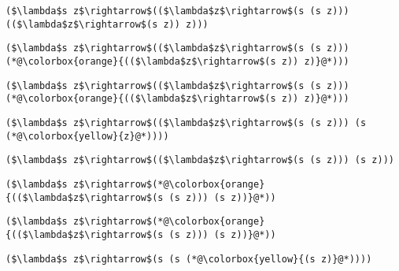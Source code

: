 \documentclass{beamer}
\begin{document}
\begin{frame}[fragile]{\CurrentSection}
\lstset{basicstyle=\ttfamily\small}\lstset{numbers=none}\lstset{language=ML}\begin{lstlisting}
($\lambda$s z$\rightarrow$(($\lambda$z$\rightarrow$(s (s z))) (($\lambda$z$\rightarrow$(s z)) z)))
\end{lstlisting}
\pause\lstset{language=ML}\begin{lstlisting}
($\lambda$s z$\rightarrow$(($\lambda$z$\rightarrow$(s (s z))) (*@\colorbox{orange}{(($\lambda$z$\rightarrow$(s z)) z)}@*)))
\end{lstlisting}

\end{frame}

\begin{frame}[fragile]{\CurrentSection}
\lstset{basicstyle=\ttfamily\small}\lstset{numbers=none}\lstset{language=ML}\begin{lstlisting}
($\lambda$s z$\rightarrow$(($\lambda$z$\rightarrow$(s (s z))) (*@\colorbox{orange}{(($\lambda$z$\rightarrow$(s z)) z)}@*)))
\end{lstlisting}
\pause\lstset{language=ML}\begin{lstlisting}
($\lambda$s z$\rightarrow$(($\lambda$z$\rightarrow$(s (s z))) (s (*@\colorbox{yellow}{z}@*))))
\end{lstlisting}

\end{frame}

\begin{frame}[fragile]{\CurrentSection}
\lstset{basicstyle=\ttfamily\small}\lstset{numbers=none}\lstset{language=ML}\begin{lstlisting}
($\lambda$s z$\rightarrow$(($\lambda$z$\rightarrow$(s (s z))) (s z)))
\end{lstlisting}
\pause\lstset{language=ML}\begin{lstlisting}
($\lambda$s z$\rightarrow$(*@\colorbox{orange}{(($\lambda$z$\rightarrow$(s (s z))) (s z))}@*))
\end{lstlisting}

\end{frame}

\begin{frame}[fragile]{\CurrentSection}
\lstset{basicstyle=\ttfamily\small}\lstset{numbers=none}\lstset{language=ML}\begin{lstlisting}
($\lambda$s z$\rightarrow$(*@\colorbox{orange}{(($\lambda$z$\rightarrow$(s (s z))) (s z))}@*))
\end{lstlisting}
\pause\lstset{language=ML}\begin{lstlisting}
($\lambda$s z$\rightarrow$(s (s (*@\colorbox{yellow}{(s z)}@*))))
\end{lstlisting}

\end{frame}
\end{document}
